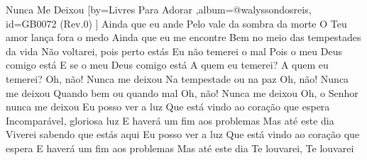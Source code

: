 \beginsong
{Nunca Me Deixou %
}[by={Livres Para Adorar %
},album={@walyssondosreis},
id={GB0072 %
(Rev.0) %
}]
\beginverse*
Ainda que eu ande
Pelo vale da sombra da morte
O Teu amor lança fora o medo
Ainda que eu me encontre
Bem no meio das tempestades da vida
Não voltarei, pois perto estás
\endverse
\beginverse*
Eu não temerei o mal
Pois o meu Deus comigo está
E se o meu Deus comigo está
A quem eu temerei? A quem eu temerei?
\endverse
\beginchorus
Oh, não! Nunca me deixou
Na tempestade ou na paz
Oh, não! Nunca me deixou
Quando bem ou quando mal
Oh, não! Nunca me deixou
Oh, o Senhor nunca me deixou
\endchorus
\beginverse*
Eu posso ver a luz
Que está vindo ao coração que espera
Incomparável, gloriosa luz
E haverá um fim aos problemas
Mas até este dia
Viverei sabendo que estás aqui
\endverse
\beginverse*
Eu posso ver a luz
Que está vindo ao coração que espera
E haverá um fim aos problemas
Mas até este dia
Te louvarei, Te louvarei
\endverse

